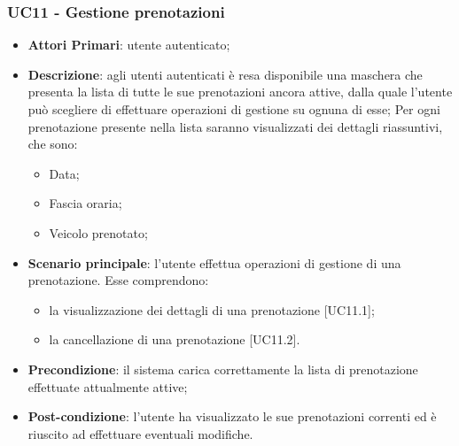 \subsubsection{UC11 - Gestione prenotazioni}
\begin{itemize}
	\item \textbf{Attori Primari}: utente autenticato;
	\item \textbf{Descrizione}: agli utenti autenticati è resa disponibile una maschera che presenta la lista di tutte le sue prenotazioni ancora attive, dalla quale l'utente può scegliere di effettuare operazioni di gestione su ognuna di esse;
	Per ogni prenotazione presente nella lista saranno visualizzati dei dettagli riassuntivi, che sono:
	\begin{itemize}
		\item Data;
		\item Fascia oraria;
		\item Veicolo prenotato;
	\end{itemize}
	\item \textbf{Scenario principale}: l'utente effettua operazioni di gestione di una prenotazione. Esse comprendono:
	\begin{itemize}
		\item la visualizzazione dei dettagli di una prenotazione [UC11.1];
		\item la cancellazione di una prenotazione [UC11.2].
	\end{itemize}
	\item \textbf{Precondizione}: il sistema carica correttamente la lista di prenotazione effettuate attualmente attive;
	\item \textbf{Post-condizione}: l'utente ha visualizzato le sue prenotazioni correnti ed è riuscito ad effettuare eventuali modifiche.
\end{itemize} 

